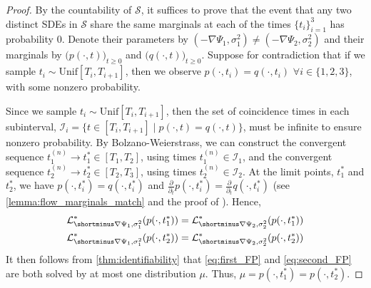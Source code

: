 \documentclass[twoside]{article}
\begin{document}
\begin{proof}
By the countability of $\mathcal{S}$, it suffices to prove that the event that any two distinct SDEs in $\mathcal{S}$ share the same marginals at each of the times $\{t_i\}_{i=1}^{3}$ has probability $0$. Denote their parameters by $(-\nabla \Psi_1, \sigma_1^2) \neq (-\nabla \Psi_2, \sigma_2^2)$ and their marginals by $\bigl( p(\cdot, t) \bigr)_{t \ge 0}$ and $\bigl( q(\cdot, t) \bigr)_{t \ge 0}$. Suppose for contradiction that if we sample $t_i \sim \mathrm{Unif}[T_i, T_{i+1}]$, then we observe $p(\cdot, t_i) = q(\cdot, t_i)$ $\forall i \in \{1,2,3\}$, with some nonzero probability.


Since we sample $t_i \sim \mathrm{Unif}[T_i, T_{i+1}]$, then the set of coincidence times in each subinterval, $\mathcal{I}_i = \{t \in [T_i, T_{i+1}] \mid p(\cdot, t) = q(\cdot, t)\}$, must be infinite to ensure nonzero probability. By Bolzano-Weierstrass, we can construct the convergent sequence $t_1^{(n)}  \to t_1^* \in [T_1,T_2]$, using times $t_1^{(n)} \in \mathcal{I}_1$, and the convergent sequence $t_2^{(n)} \to t_2^*\in [T_2,T_3]$, using times $t_2^{(n)} \in \mathcal{I}_2$. At the limit points, $t_1^*$ and $t_2^*$, we have  $p(\cdot, t_i^*) = q(\cdot, t_i^*)$ and $\frac{\partial}{\partial_t} p(\cdot, t_i^*) = \frac{\partial}{\partial_t} q(\cdot, t_i^*)$ (see \cref{lemma:flow_marginals_match} and the proof of \citet[Corollary 2]{hashimoto2016learning}). Hence, 
\begin{align}
\label{eq:first_FP}
    \mathcal{L}^*_{\shortminus \nabla \Psi_1, \sigma_1^2}(p(\cdot, t_1^*)) &= \mathcal{L}^*_{\shortminus \nabla \Psi_2, \sigma_2^2}(p(\cdot, t_1^*)) \\
    \mathcal{L}^*_{\shortminus \nabla \Psi_1, \sigma_1^2}(p(\cdot, t_2^*)) &= \mathcal{L}^*_{\shortminus \nabla \Psi_2, \sigma_2^2}(p(\cdot, t_2^*)) 
\label{eq:second_FP}
\end{align}
It then follows from \cref{thm:identifiability} that \eqref{eq:first_FP} and \eqref{eq:second_FP} are both solved by at most one distribution $\mu$. Thus, $\mu = p(\cdot, t_1^*) = p(\cdot, t_2^*)$.

\end{proof}
\end{document}
